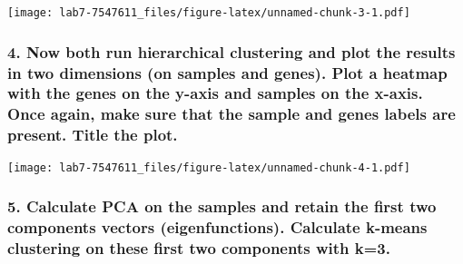 \documentclass[]{article}
\newenvironment{Shaded}{\begin{snugshade}}{\end{snugshade}}
\newcommand{\KeywordTok}[1]{\textcolor[rgb]{0.13,0.29,0.53}{\textbf{{#1}}}}
\newcommand{\DataTypeTok}[1]{\textcolor[rgb]{0.13,0.29,0.53}{{#1}}}
\newcommand{\StringTok}[1]{\textcolor[rgb]{0.31,0.60,0.02}{{#1}}}
\newcommand{\NormalTok}[1]{{#1}}
\begin{document}
\texttt{[image: lab7-7547611\_files/figure-latex/unnamed-chunk-3-1.pdf]}

\newpage

\subsubsection{4. Now both run hierarchical clustering and plot the
results in two dimensions (on samples and genes). Plot a heatmap with
the genes on the y-axis and samples on the x-axis. Once again, make sure
that the sample and genes labels are present. Title the
plot.}\label{now-both-run-hierarchical-clustering-and-plot-the-results-in-two-dimensions-on-samples-and-genes.-plot-a-heatmap-with-the-genes-on-the-y-axis-and-samples-on-the-x-axis.-once-again-make-sure-that-the-sample-and-genes-labels-are-present.-title-the-plot.}

\begin{Shaded}
\end{Shaded}

\texttt{[image: lab7-7547611\_files/figure-latex/unnamed-chunk-4-1.pdf]}

\newpage

\subsubsection{5. Calculate PCA on the samples and retain the first two
components vectors (eigenfunctions). Calculate k-means clustering on
these first two components with
k=3.}\label{calculate-pca-on-the-samples-and-retain-the-first-two-components-vectors-eigenfunctions.-calculate-k-means-clustering-on-these-first-two-components-with-k3.}
\end{document}
